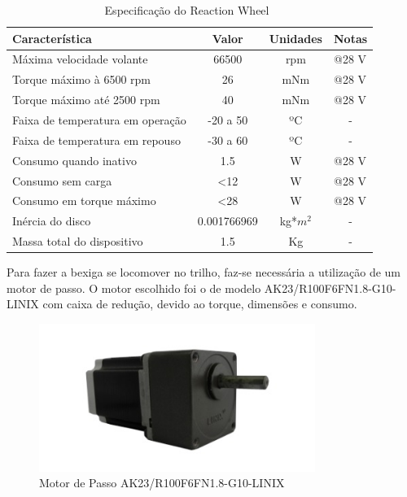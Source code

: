 \begin{table}[H]
	\centering
	\begin{tabular}{|l|c|c|l|}
	\hline
	\rowcolor[HTML]{C0C0C0}
	\textbf{Característica}          & \textbf{Valor} & \textbf{Unidades} & \textbf{Notas}        \\ \hline
	Máxima velocidade volante        & 66500          & rpm               & @28 V                 \\ \hline
	Torque máximo à 6500 rpm         & 26             & mNm               & @28 V                 \\ \hline
	Torque máximo até 2500 rpm       & 40             & mNm               & @28 V                 \\ \hline
	Faixa de temperatura em operação & -20 a 50       & ºC                & \multicolumn{1}{c}{-} \\ \hline
	Faixa de temperatura em repouso  & -30 a 60       & ºC                & \multicolumn{1}{c}{-} \\ \hline
	Consumo quando inativo           & 1.5            & W                 & @28 V                 \\ \hline
	Consumo sem carga                & \textless 12   & W                 & @28 V                 \\ \hline
	Consumo em torque máximo         & \textless 28   & W                 & @28 V                 \\ \hline
	Inércia do disco                 & 0.001766969    & kg*$m^{2}$        & \multicolumn{1}{c}{-} \\ \hline
	Massa total do dispositivo       & 1.5            & Kg                & \multicolumn{1}{c}{-} \\ \hline
	\end{tabular}
	\caption[Especificação do Reaction Wheel]{Especificação do Reaction Wheel~\cite{clyde}}
	\label{tab:reactionWheel}
\end{table}

Para fazer a bexiga se locomover no trilho, faz-se necessária a utilização de um motor de passo. O motor escolhido foi o de modelo AK23/R100F6FN1.8-G10-LINIX com caixa de redução, devido ao torque, dimensões e consumo.

\begin{figure}[H]
  \centering
  \includegraphics[width=0.8\textwidth]{figuras/M}
  \caption[Motor de Passo AK23/R100F6FN1.8-G10-LINIX]{Motor de Passo AK23/R100F6FN1.8-G10-LINIX~\cite{robocore}}
  \label{img:motorpasso}
\end{figure}

